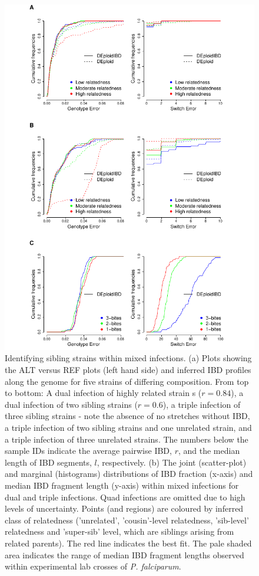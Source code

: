 \documentclass[9pt,lineno]{elife}
\begin{document}
\begin{figure}[ht]
  \begin{center}
  \includegraphics[width=\textwidth]{Fig3.pdf}
   \caption{Identifying sibling strains within mixed infections.  (a) Plots showing the ALT versus REF plots (left hand side) and inferred IBD profiles along the genome for five strains of differing composition.  From top to bottom: A dual infection of highly related strain s ($r=0.84$), a dual infection of two sibling strains ($r=0.6$), a triple infection of three sibling strains - note the absence of no stretches without IBD, a triple infection of two sibling strains and one unrelated strain, and a triple infection of three unrelated strains.  The numbers below the sample IDs indicate the average pairwise IBD, $r$, and the median length of IBD segments, $l$, respectively.  (b) The joint (scatter-plot) and marginal (histograms) distributions of IBD fraction (x-axis) and median IBD fragment length (y-axis) within mixed infections for dual and triple infections.  Quad infections are omitted due to high levels of uncertainty. Points (and regions) are coloured by inferred class of relatedness ('unrelated', 'cousin'-level relatedness, 'sib-level' relatedness and 'super-sib' level, which are siblings arising from related parents).  The red line indicates the best fit. The pale shaded area indicates the range of median IBD fragment lengths observed within experimental lab crosses of {\it P. falciparum}.}\label{fig:strainIBD}

\end{center}
\end{figure}
\end{document}
